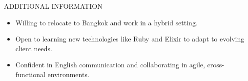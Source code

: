 \documentclass{resume} %
\begin{document}
\begin{rSection}{ADDITIONAL INFORMATION}

\begin{itemize}
    \item Willing to relocate to Bangkok and work in a hybrid setting.
    \item Open to learning new technologies like Ruby and Elixir to adapt to evolving client needs.
    \item Confident in English communication and collaborating in agile, cross-functional environments.
\end{itemize}

\end{rSection}
\end{document}
